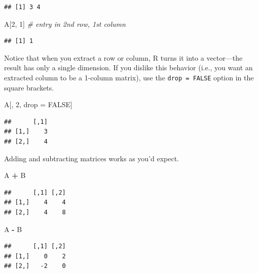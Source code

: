 \documentclass[
  12pt,
  oneside,openany]{book}
\newenvironment{Shaded}{\begin{snugshade}}{\end{snugshade}}
\newcommand{\CommentTok}[1]{\textcolor[rgb]{0.56,0.35,0.01}{\textit{#1}}}
\newcommand{\DecValTok}[1]{\textcolor[rgb]{0.00,0.00,0.81}{#1}}
\newcommand{\NormalTok}[1]{#1}
\newcommand{\OperatorTok}[1]{\textcolor[rgb]{0.81,0.36,0.00}{\textbf{#1}}}
\newcommand{\OtherTok}[1]{\textcolor[rgb]{0.56,0.35,0.01}{#1}}
\newcommand{\StringTok}[1]{\textcolor[rgb]{0.31,0.60,0.02}{#1}}
\begin{document}
\begin{verbatim}
## [1] 3 4
\end{verbatim}

\begin{Shaded}
\begin{Highlighting}[]
\NormalTok{A[}\DecValTok{2}\NormalTok{, }\DecValTok{1}\NormalTok{]  }\CommentTok{\# entry in 2nd row, 1st column}
\end{Highlighting}
\end{Shaded}

\begin{verbatim}
## [1] 1
\end{verbatim}

Notice that when you extract a row or column, R turns it into a vector---the result has only a single dimension. If you dislike this behavior (i.e., you want an extracted column to be a 1-column matrix), use the \texttt{drop\ =\ FALSE} option in the square brackets.

\begin{Shaded}
\begin{Highlighting}[]
\NormalTok{A[, }\DecValTok{2}\NormalTok{, drop =}\StringTok{ }\OtherTok{FALSE}\NormalTok{]}
\end{Highlighting}
\end{Shaded}

\begin{verbatim}
##      [,1]
## [1,]    3
## [2,]    4
\end{verbatim}

Adding and subtracting matrices works as you'd expect.

\begin{Shaded}
\begin{Highlighting}[]
\NormalTok{A }\OperatorTok{+}\StringTok{ }\NormalTok{B}
\end{Highlighting}
\end{Shaded}

\begin{verbatim}
##      [,1] [,2]
## [1,]    4    4
## [2,]    4    8
\end{verbatim}

\begin{Shaded}
\begin{Highlighting}[]
\NormalTok{A }\OperatorTok{{-}}\StringTok{ }\NormalTok{B}
\end{Highlighting}
\end{Shaded}

\begin{verbatim}
##      [,1] [,2]
## [1,]    0    2
## [2,]   -2    0
\end{verbatim}
\end{document}
